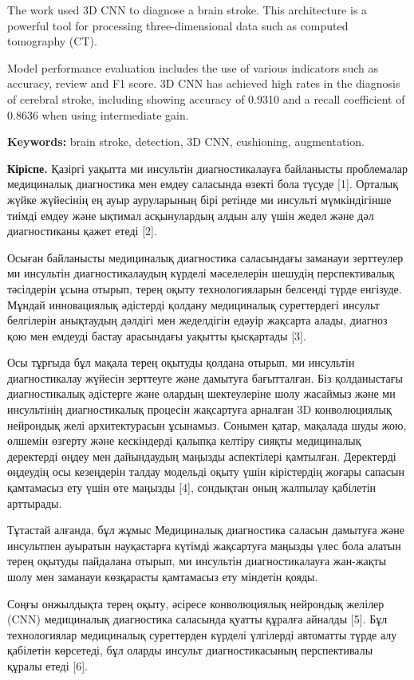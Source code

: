 The work used 3D CNN to diagnose a brain stroke. This architecture is a
powerful tool for processing three-dimensional data such as computed
tomography (CT).

Model performance evaluation includes the use of various indicators such
as accuracy, review and F1 score. 3D CNN has achieved high rates in the
diagnosis of cerebral stroke, including showing accuracy of 0.9310 and a
recall coefficient of 0.8636 when using intermediate gain.

\textbf{Keywords:} brain stroke, detection, 3D CNN, cushioning,
augmentation.

\textbf{Кіріспе.} Қазіргі уақытта ми инсультін диагностикалауға
байланысты проблемалар медициналық диагностика мен емдеу саласында
өзекті бола түсуде {[}1{]}. Орталық жүйке жүйесінің ең ауыр ауруларының
бірі ретінде ми инсульті мүмкіндігінше тиімді емдеу және ықтимал
асқынулардың алдын алу үшін жедел және дәл диагностиканы қажет етеді
{[}2{]}.

Осыған байланысты медициналық диагностика саласындағы заманауи
зерттеулер ми инсультін диагностикалаудың күрделі мәселелерін шешудің
перспективалық тәсілдерін ұсына отырып, терең оқыту технологияларын
белсенді түрде енгізуде. Мұндай инновациялық әдістерді қолдану
медициналық суреттердегі инсульт белгілерін анықтаудың дәлдігі мен
жеделдігін едәуір жақсарта алады, диагноз қою мен емдеуді бастау
арасындағы уақытты қысқартады {[}3{]}.

Осы тұрғыда бұл мақала терең оқытуды қолдана отырып, ми инсультін
диагностикалау жүйесін зерттеуге және дамытуға бағытталған. Біз
қолданыстағы диагностикалық әдістерге және олардың шектеулеріне шолу
жасаймыз және ми инсультінің диагностикалық процесін жақсартуға арналған
3D конволюциялық нейрондық желі архитектурасын ұсынамыз. Сонымен қатар,
мақалада шуды жою, өлшемін өзгерту және кескіндерді қалыпқа келтіру
сияқты медициналық деректерді өңдеу мен дайындаудың маңызды аспектілері
қамтылған. Деректерді өңдеудің осы кезеңдерін талдау модельді оқыту үшін
кірістердің жоғары сапасын қамтамасыз ету үшін өте маңызды {[}4{]},
сондықтан оның жалпылау қабілетін арттырады.

Тұтастай алғанда, бұл жұмыс Медициналық диагностика саласын дамытуға
және инсультпен ауыратын науқастарға күтімді жақсартуға маңызды үлес
бола алатын терең оқытуды пайдалана отырып, ми инсультін
диагностикалауға жан-жақты шолу мен заманауи көзқарасты қамтамасыз ету
міндетін қояды.

Соңғы онжылдықта терең оқыту, әсіресе конволюциялық нейрондық желілер
(CNN) медициналық диагностика саласында қуатты құралға айналды {[}5{]}.
Бұл технологиялар медициналық суреттерден күрделі үлгілерді автоматты
түрде алу қабілетін көрсетеді, бұл оларды инсульт диагностикасының
перспективалы құралы етеді {[}6{]}.

